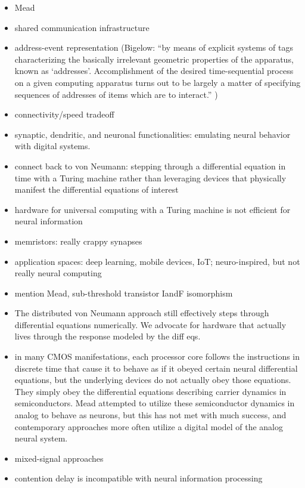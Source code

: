 \documentclass[twocolumn]{article}
\begin{document}
\begin{itemize}
\item Mead
\item shared communication infrastructure
\item address-event representation (Bigelow: ``by means of explicit systems of tags characterizing the basically irrelevant geometric properties of the apparatus, known as `addresses'. Accomplishment of the desired time-sequential process on a given computing apparatus turns out to be largely a matter of specifying sequences of addresses of items which are to interact.'' \cite{bi1955})
\item connectivity/speed tradeoff
\item synaptic, dendritic, and neuronal functionalities: emulating neural behavior with digital systems.
\item connect back to von Neumann: stepping through a differential equation in time with a Turing machine rather than leveraging devices that physically manifest the differential equations of interest
\item hardware for universal computing with a Turing machine is not efficient for neural information
\item memristors: really crappy synapses
\item application spaces: deep learning, mobile devices, IoT; neuro-inspired, but not really neural computing
\item mention Mead, sub-threshold transistor IandF isomorphism
\item The distributed von Neumann approach still effectively steps through differential equations numerically. We advocate for hardware that actually lives through the response modeled by the diff eqs. 
\item in many CMOS manifestations, each processor core follows the instructions in discrete time that cause it to behave as if it obeyed certain neural differential equations, but the underlying devices do not actually obey those equations. They simply obey the differential equations describing carrier dynamics in semiconductors. Mead attempted to utilize these semiconductor dynamics in analog to behave as neurons, but this has not met with much success, and contemporary approaches more often utilize a digital model of the analog neural system.
\item mixed-signal approaches
\item contention delay is incompatible with neural information processing
\end{itemize}
\end{document}

